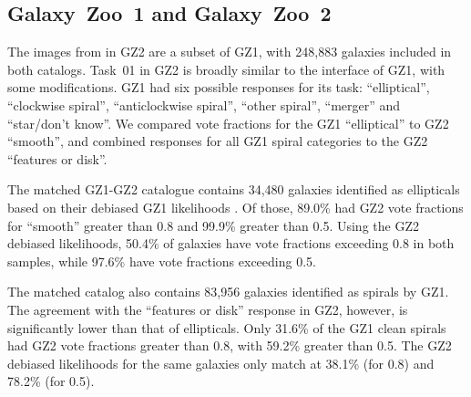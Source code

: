 \documentclass[useAMS,usenatbib]{mn2e}
\begin{document}
\subsection{Galaxy~Zoo~1 and Galaxy~Zoo~2}

The images from in GZ2 are a subset of GZ1, with 248,883 galaxies included in both catalogs. Task~01 in GZ2 is broadly similar to the interface of GZ1, with some modifications. GZ1 had six possible responses for its task: ``elliptical'', ``clockwise spiral'', ``anticlockwise spiral'', ``other spiral'', ``merger'' and ``star/don't know''. We compared vote fractions for the GZ1 ``elliptical'' to GZ2 ``smooth'', and combined responses for all GZ1 spiral categories to the GZ2 ``features or disk''. 

The matched GZ1-GZ2 catalogue contains 34,480 galaxies identified as ellipticals based on their debiased GZ1 likelihoods \citep{lin11}. Of those, 89.0\% had GZ2 vote fractions for ``smooth'' greater than 0.8 and 99.9\% greater than 0.5. Using the GZ2 debiased likelihoods, 50.4\% of galaxies have vote fractions exceeding 0.8 in both samples, while 97.6\% have vote fractions exceeding 0.5. 

The matched catalog also contains 83,956 galaxies identified as spirals by GZ1. The agreement with the ``features or disk'' response in GZ2, however, is significantly lower than that of ellipticals. Only 31.6\% of the GZ1 clean spirals had GZ2 vote fractions greater than 0.8, with 59.2\% greater than 0.5. The GZ2 debiased likelihoods for the same galaxies only match at 38.1\% (for 0.8) and 78.2\% (for 0.5). 
\end{document}

